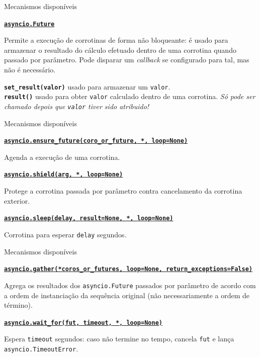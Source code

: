 \documentclass[12pt]{beamer}
\begin{document}
\begin{frame}[fragile]{Mecanismos disponíveis}
  \small{
  \textbf{\texttt{\href{https://docs.python.org/3/library/asyncio-task.html\#asyncio.Future}{asyncio.Future}}}

  Permite a execução de corrotinas de forma não bloqueante: é usado para armazenar o resultado do cálculo efetuado dentro de uma corrotina quando passado por parâmetro. Pode disparar um \textit{callback} se configurado para tal, mas não é necessário.

  \textbf{\texttt{set\_result(valor)}} usado para armazenar um \texttt{valor}.\\

  \textbf{\texttt{result()}} usado para obter \texttt{valor} calculado dentro de uma corrotina. \emph{Só pode ser chamado depois que \texttt{valor} tiver sido atribuido!}
  }
\end{frame}

\begin{frame}[fragile]{Mecanismos disponíveis}
  \small{
  \textbf{\texttt{\href{https://docs.python.org/3/library/asyncio-task.html\#asyncio.ensure\_future}{asyncio.ensure\_future(coro\_or\_future, *, loop=None)}}}

  Agenda a execução de uma corrotina.\\\vspace{0.25cm}

  \textbf{\texttt{\href{https://docs.python.org/3/library/asyncio-task.html\#asyncio.shield}{asyncio.shield(arg, *, loop=None)}}}

  Protege a corrotina passada por parâmetro contra cancelamento da corrotina exterior.\\\vspace{0.25cm}

  \textbf{\texttt{\href{https://docs.python.org/3/library/asyncio-task.html\#asyncio.sleep}{asyncio.sleep(delay, result=None, *, loop=None)}}}

  Corrotina para esperar \texttt{delay} segundos.\\\vspace{0.25cm}
  }
\end{frame}

\begin{frame}[fragile]{Mecanismos disponíveis}
  \small{
  \textbf{\texttt{\href{https://docs.python.org/3/library/asyncio-task.html\#asyncio.gather}{asyncio.gather(*coros\_or\_futures, loop=None, return\_exceptions=False)}}}

  Agrega os resultados dos \texttt{asyncio.Future} passados por parâmetro de acordo com a ordem de instanciação da sequência original (não necessariamente a ordem de término).

  \textbf{\texttt{\href{https://docs.python.org/3/library/asyncio-task.html\#asyncio.wait\_for}{asyncio.wait\_for(fut, timeout, *, loop=None)}}}

  Espera \texttt{timeout} segundos: caso não termine no tempo, cancela \texttt{fut} e lança \texttt{asyncio.TimeoutError}.\\\vspace{0.25cm}
  }
\end{frame}
\end{document}
